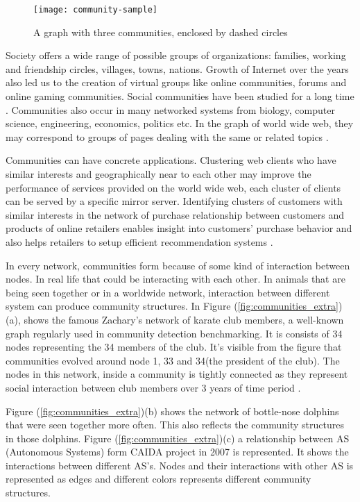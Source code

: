 \vfill
\pagebreak

\begin{figure}[H]
	\centering
	\texttt{[image: community-sample]}
	\caption{A graph with three communities, enclosed by dashed circles}
	\label{fig:community}
\end{figure}

Society offers a wide range of possible groups of organizations: families, working and friendship circles, villages, towns, nations. Growth of Internet over the years also led us to the creation of virtual groups like online communities, forums and online gaming communities. Social communities have been studied for a long time \cite{ref-6}. Communities also occur in many networked systems from biology, computer science, engineering, economics, politics etc. In the graph of world wide web, they may correspond to groups of pages dealing with the same or related topics \cite{ref-36}.

Communities can have concrete applications. Clustering web clients who have similar interests and geographically near to each other may improve the performance of services provided on the world wide web, each cluster of clients can be served by a specific mirror server. Identifying clusters of customers with similar interests in the network of purchase relationship between customers and products of online retailers enables insight into customers' purchase behavior and also helps retailers to setup efficient recommendation systems \cite{ref-37}.

In every network, communities form because of some kind of interaction between nodes. In real life that could be interacting with each other. In animals that are being seen together or in a worldwide network, interaction between different system can produce community structures. In Figure (\ref{fig:communities_extra})(a), shows the famous Zachary's network of karate club members, a well-known graph regularly used in community detection benchmarking. It is consists of 34 nodes representing the 34 members of the club. It's visible from the figure that communities evolved around node 1, 33 and 34(the president of the club). The nodes in this network, inside a community is tightly connected as they represent social interaction between club members over 3 years of time period \cite{ref-58}.

Figure (\ref{fig:communities_extra})(b) shows the network of bottle-nose dolphins that were seen together more often. This also reflects the community structures in those dolphins. Figure (\ref{fig:communities_extra})(c) a relationship between AS (Autonomous Systems) form CAIDA project in 2007 is represented. It shows the interactions between different AS's. Nodes and their interactions with other AS is represented as edges and different colors represents different community structures.


